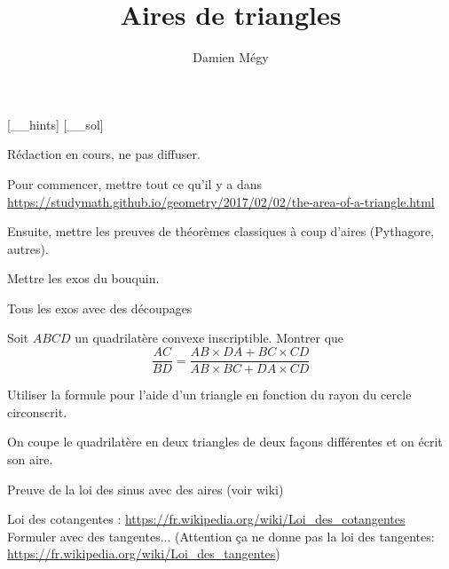 




[_\jobname_hints]
[_\jobname_sol]


\title{Aires de triangles}
\author{Damien Mégy}
\maketitle

Rédaction en cours, ne pas diffuser.

Pour commencer, mettre tout ce qu'il y a dans \url{https://studymath.github.io/geometry/2017/02/02/the-area-of-a-triangle.html}

Ensuite, mettre les preuves de théorèmes classiques à coup d'aires (Pythagore, autres).

Mettre les exos du bouquin.

Tous les exos avec des découpages

\begin{exo}
Soit $ABCD$ un quadrilatère convexe inscriptible.
Montrer que
\[ \frac{AC}{BD} = \frac{AB\times DA + BC\times CD}{AB\times BC + DA\times CD}\]
\begin{hint}
Utiliser la formule pour l'aide d'un triangle en fonction du rayon du cercle circonscrit.
\end{hint}
\begin{sol}
On coupe le quadrilatère en deux triangles de deux façons différentes et on écrit son aire.
\end{sol}
\end{exo}



Preuve de la loi des sinus avec des aires (voir wiki)


Loi des cotangentes : \url{https://fr.wikipedia.org/wiki/Loi_des_cotangentes} Formuler avec des tangentes...
(Attention ça ne donne pas la l\og oi des tangentes\fg : \url{https://fr.wikipedia.org/wiki/Loi_des_tangentes})



\indications
\correction



